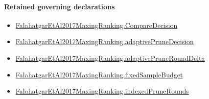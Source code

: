 \documentclass[10pt]{article}
\begin{document}
\paragraph{Retained governing declarations}
\begin{itemize}\raggedright
\item \hyperlink{governing-declaration-3723216c72fc3dc8}{Falahatgar\allowbreak{}Et\allowbreak{}Al2017\allowbreak{}Maxing\allowbreak{}Ranking.\allowbreak{}Compare\allowbreak{}Decision}
\item \hyperlink{governing-declaration-7291708c37484041}{Falahatgar\allowbreak{}Et\allowbreak{}Al2017\allowbreak{}Maxing\allowbreak{}Ranking.\allowbreak{}adaptive\allowbreak{}Prune\allowbreak{}Decision}
\item \hyperlink{governing-declaration-0a2d9c4ad2e46f08}{Falahatgar\allowbreak{}Et\allowbreak{}Al2017\allowbreak{}Maxing\allowbreak{}Ranking.\allowbreak{}adaptive\allowbreak{}Prune\allowbreak{}Round\allowbreak{}Delta}
\item \hyperlink{governing-declaration-4b4daf4bb2493573}{Falahatgar\allowbreak{}Et\allowbreak{}Al2017\allowbreak{}Maxing\allowbreak{}Ranking.\allowbreak{}fixed\allowbreak{}Sample\allowbreak{}Budget}
\item \hyperlink{governing-declaration-9f658f52158e6dab}{Falahatgar\allowbreak{}Et\allowbreak{}Al2017\allowbreak{}Maxing\allowbreak{}Ranking.\allowbreak{}indexed\allowbreak{}Prune\allowbreak{}Rounds}
\end{itemize}
\end{document}
